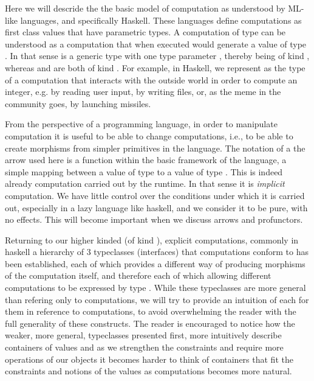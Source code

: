 Here we will descride the the basic model of computation as understood
by ML-like languages, and specifically Haskell. These languages define
computations as first class values that have parametric types. A
computation of type  can be understood as a computation that
when executed would generate a value of type . In that sense
 is a generic type with one type parameter , thereby
being of kind \hask{* -> *}, whereas  and  are both
of kind \hask{*}. For example, in Haskell, we represent as  the type of a computation that interacts with the outside world
in order to compute an integer, e.g. by reading user input, by writing
files, or, as the meme in the community goes, by launching missiles.

From the perspective of a programming language, in order to manipulate
computation it is useful to be able to change computations, i.e., to
be able to create morphisms  from simpler primitives
in the language. The notation of a the arrow \hask{->} used here is a
function within the basic framework of the language, a simple mapping
between a value of type  to a value of type . This
is indeed already computation carried out by the runtime.  In that
sense it is \emph{implicit} computation. We have little control over
the conditions under which it is carried out, especially in a lazy
language like haskell, and we consider it to be pure, with no
effects. This will become important when we discuss arrows and
profunctors.

Returning to our higher kinded (of kind \hask{* -> *}), explicit
computations, commonly in haskell a hierarchy of 3 typeclasses
(interfaces) that computations conform to has been established, each
of which provides a different way of producing morphisms of the
computation itself, and therefore each of which allowing different
computations to be expressed by type . While these typeclasses are
more general than refering only to computations, we will try to
provide an intuition of each for them in reference to computations, to
avoid overwhelming the reader with the full generality of these
constructs. The reader is encouraged to notice how the weaker, more
general, typeclasses presented first, more intuitively describe
containers of values and as we strengthen the constraints and require
more operations of our objects it becomes harder to think of
containers that fit the constraints and notions of the values as
computations becomes more natural.

